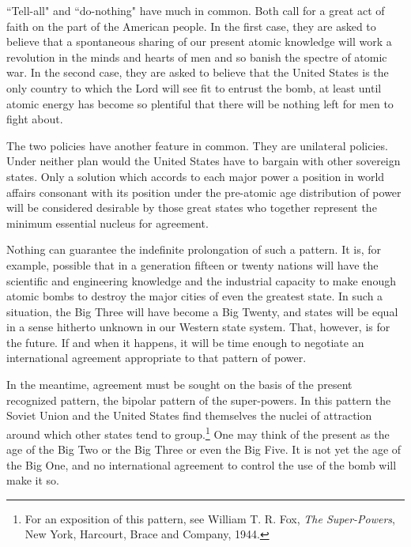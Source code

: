 ``Tell-all" and ``do-nothing" have much in common. Both call for a great act of faith on the part of the American people. In the first case, they are asked to believe that a spontaneous sharing of our present atomic knowledge will work a revolution in the minds and hearts of men and so banish the spectre of atomic war. In the second case, they are asked to believe that the United States is the only country to which the Lord will see fit to entrust the bomb, at least until atomic energy has become so plentiful that there will be nothing left for men to fight about.

The two policies have another feature in common. They are unilateral policies. Under neither plan would the United States have to bargain with other sovereign states. Only a solution which accords to each major power a position in world affairs consonant with its position under the pre-atomic age distribution of power will be considered desirable by those great states who together represent the minimum essential nucleus for agreement.

Nothing can guarantee the indefinite prolongation of such a pattern. It is, for example, possible that in a generation fifteen or twenty nations will have the scientific and engineering knowledge and the industrial capacity to make enough atomic bombs to destroy the major cities of even the greatest state. In such a situation, the Big Three will have become a Big Twenty, and states will be equal in a sense hitherto unknown in our Western state system. That, however, is for the future. If and when it happens, it will be time enough to negotiate an international agreement appropriate to that pattern of power.

In the meantime, agreement must be sought on the basis of the present recognized pattern, the bipolar pattern of the super-powers. In this pattern the Soviet Union and the United States find themselves the nuclei of attraction around which other states tend to group.\footnote{For an exposition of this pattern, see William T. R. Fox, \textit{The Super-Powers}, New York, Harcourt, Brace and Company, 1944.} One may think of the present as the age of the Big Two or the Big Three or even the Big Five. It is not yet the age of the Big One, and no international agreement to control the use of the bomb will make it so.


